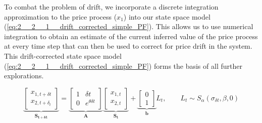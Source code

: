 \documentclass[../main.tex]{subfiles}
\begin{document}
To combat the problem of drift, we incorporate a discrete integration approximation to the price process ($x_1$) into our state space model (\autoref{eq:2__2__1__drift_corrected_simple_PF}). This allows us to use numerical integration to obtain an estimate of the current inferred value of the price process at every time step that can then be used to correct for price drift in the system. This drift-corrected state space model (\autoref{eq:2__2__1__drift_corrected_simple_PF}) forms the basis of all further explorations.

\begin{equation}
\underbrace{
	\begin{bmatrix}
	x_{1,t+\delta t} \\ x_{2,t + \delta_t}
	\end{bmatrix}
}_{\mathbf{S_{t + \delta t}}}
=
\underbrace{
	\begin{bmatrix}
	1 & \delta t \\ 0 & e^{\theta \delta t}
	\end{bmatrix}
}_{\mathbf{A}}
\underbrace{
	\begin{bmatrix}
	x_{1,t} \\ x_{2,t}
	\end{bmatrix}
}_{\mathbf{S_t}}
+ 
\underbrace{
	\begin{bmatrix}
	0 \\ 1
	\end{bmatrix}
}_{\mathbf{b}} L_t, \qquad  L_t \sim S_\alpha (\sigma_{\delta t}, \beta, 0)
\label{eq:2__2__1__drift_corrected_simple_PF}
\end{equation}
\end{document}
